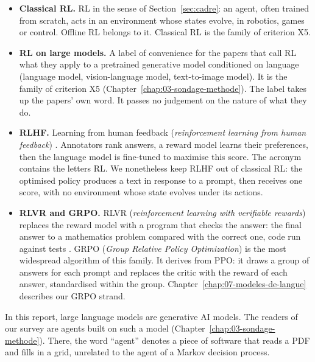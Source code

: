 \begin{itemize}
  \item \textbf{Classical RL.} RL in the sense of Section~\ref{sec:cadre}: an agent, often trained from
  scratch, acts in an environment whose states evolve, in robotics, games or control. Offline RL
  belongs to it. Classical RL is the  family of criterion X5.
  \item \textbf{RL on large models.} A label of convenience for the papers that call RL what they
  apply to a pretrained generative model conditioned on language (language model, vision-language
  model, text-to-image model). It is the  family of criterion X5
  (Chapter~\ref{chap:03-sondage-methode}). The label takes up the papers' own word. It passes no
  judgement on the nature of what they do.
  \item \textbf{RLHF.} Learning from human feedback (\emph{reinforcement learning from human feedback})
  \parencite{christiano2017deep,ouyang2022instructgpt}. Annotators rank answers, a reward model learns
  their preferences, then the language model is fine-tuned to maximise this score. The acronym contains
  the letters RL. We nonetheless keep RLHF out of classical RL: the optimised policy produces a text in
  response to a prompt, then receives one score, with no environment whose state evolves under its
  actions.
  \item \textbf{RLVR and GRPO.} RLVR (\emph{reinforcement learning with verifiable rewards}) replaces
  the reward model with a program that checks the answer: the final answer to a mathematics problem
  compared with the correct one, code run against tests \parencite{deepseek2025r1}. GRPO (\emph{Group
  Relative Policy Optimization}) \parencite{shao2024deepseekmath} is the most widespread algorithm of
  this family. It derives from PPO: it draws a group of answers for each prompt and replaces the critic
  with the reward of each answer, standardised within the group. Chapter~\ref{chap:07-modeles-de-langue}
  describes our GRPO strand.
\end{itemize}

In this report, large language models are generative AI models. The readers of our survey are agents
built on such a model (Chapter~\ref{chap:03-sondage-methode}). There, the word \enquote{agent} denotes
a piece of software that reads a PDF and fills in a grid, unrelated to the agent of a Markov decision process.
